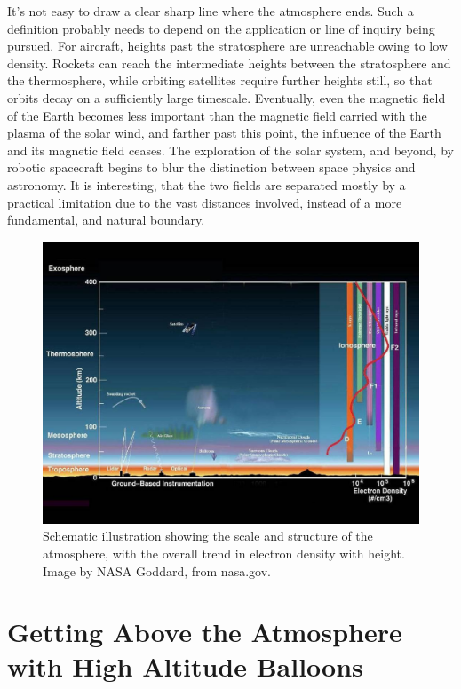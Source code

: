 It's not easy to draw a clear sharp line where the atmosphere ends. Such a definition probably needs to depend on the application or line of inquiry being pursued. For aircraft, heights past the stratosphere are unreachable owing to low density. Rockets can reach the intermediate heights between the stratosphere and the thermosphere, while orbiting satellites require further heights still, so that orbits decay on a sufficiently large timescale. Eventually, even the magnetic field of the Earth becomes less important than the magnetic field carried with the plasma of the solar wind, and farther past this point, the influence of the Earth and its magnetic field ceases. The exploration of the solar system, and beyond, by robotic spacecraft begins to  blur the distinction between space physics and astronomy. It is interesting, that the two fields are separated mostly by a practical limitation due to the vast distances involved, instead of a more fundamental, and natural boundary. 


\begin{figure}[p]
\label{}
\begin{centering}
\includegraphics[width=.9\textwidth]{figures/chapter_1/atmosphere_schematic/atmosphere_schematic}
\caption{Schematic illustration showing the scale and structure of the atmosphere, with the overall trend in electron density with height. Image by NASA Goddard, from nasa.gov.}
\end{centering}
\end{figure}
\newpage

\section{Getting Above the Atmosphere with High Altitude Balloons}

